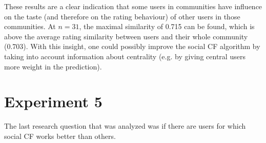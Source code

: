 These results are a clear indication that some users in communities have influence on the taste (and therefore on the rating behaviour) of other users in those communities. At $n=31$, the maximal similarity of 0.715 can be found, which is above the average rating similarity between users and their whole community (0.703). With this insight, one could possibly improve the social CF algorithm by taking into account information about centrality (e.g. by giving central users more weight in the prediction).
\section{Experiment 5}
\label{st:experiment5} The last research question that was analyzed was if there are users for which social CF works better than others. 